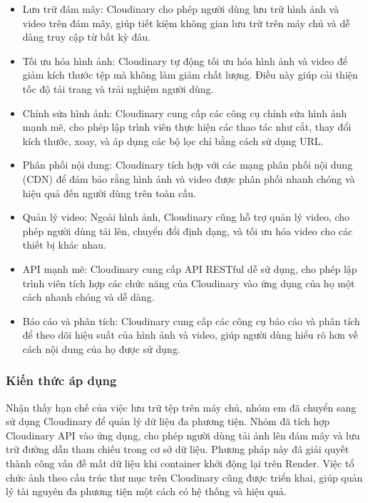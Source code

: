 \documentclass[../BTL.tex]{subfiles}
\begin{document}
\begin{itemize}
    \item Lưu trữ đám mây: Cloudinary cho phép người dùng lưu trữ hình ảnh và video trên đám mây, giúp tiết kiệm không gian lưu trữ trên máy chủ và dễ dàng truy cập từ bất kỳ đâu.
    \item Tối ưu hóa hình ảnh: Cloudinary tự động tối ưu hóa hình ảnh và video để giảm kích thước tệp mà không làm giảm chất lượng. Điều này giúp cải thiện tốc độ tải trang và trải nghiệm người dùng.
    \item Chỉnh sửa hình ảnh: Cloudinary cung cấp các công cụ chỉnh sửa hình ảnh mạnh mẽ, cho phép lập trình viên thực hiện các thao tác như cắt, thay đổi kích thước, xoay, và áp dụng các bộ lọc chỉ bằng cách sử dụng URL.
    \item Phân phối nội dung: Cloudinary tích hợp với các mạng phân phối nội dung (CDN) để đảm bảo rằng hình ảnh và video được phân phối nhanh chóng và hiệu quả đến người dùng trên toàn cầu.
    \item Quản lý video: Ngoài hình ảnh, Cloudinary cũng hỗ trợ quản lý video, cho phép người dùng tải lên, chuyển đổi định dạng, và tối ưu hóa video cho các thiết bị khác nhau.
    \item API mạnh mẽ: Cloudinary cung cấp API RESTful dễ sử dụng, cho phép lập trình viên tích hợp các chức năng của Cloudinary vào ứng dụng của họ một cách nhanh chóng và dễ dàng.
    \item Báo cáo và phân tích: Cloudinary cung cấp các công cụ báo cáo và phân tích để theo dõi hiệu suất của hình ảnh và video, giúp người dùng hiểu rõ hơn về cách nội dung của họ được sử dụng.
\end{itemize}

\subsubsection{ Kiến thức áp dụng}
Nhận thấy hạn chế của việc lưu trữ tệp trên máy chủ, nhóm em đã chuyển sang sử dụng Cloudinary để quản lý dữ liệu đa phương tiện. Nhóm đã tích hợp Cloudinary API vào ứng dụng, cho phép người dùng tải ảnh lên đám mây và lưu trữ đường dẫn tham chiếu trong cơ sở dữ liệu. Phương pháp này đã giải quyết thành công vấn đề mất dữ liệu khi container khởi động lại trên Render. Việc tổ chức ảnh theo cấu trúc thư mục trên Cloudinary cũng được triển khai, giúp quản lý tài nguyên đa phương tiện một cách có hệ thống và hiệu quả.
\end{document}

